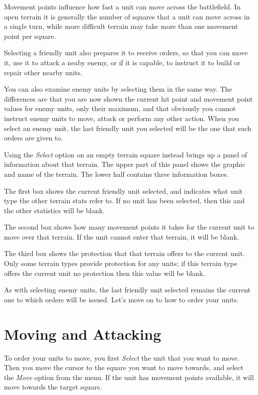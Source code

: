 Movement points influence how fast a unit can move across the battlefield. In open terrain it is generally the number of squares that a unit can move across in a single turn, while more difficult terrain may take more than one movement point per square.

Selecting a friendly unit also prepares it to receive orders, so that you can move it, use it to attack a neaby enemy, or if it is capable, to instruct it to build or repair other nearby units.

You can also examine enemy units by selecting them in the same way. The differences are that you are now shown the current hit point and movement point values for enemy units, only their maximum, and that obviously you cannot instruct enemy units to move, attack or perform any other action. When you select an enemy unit, the last friendly unit you selected will be the one that such orders are given to.

Using the {\it Select} option on an empty terrain square instead brings up a panel of information about that terrain. The upper part of this panel shows the graphic and name of the terrain. The lower half contains three information boxes.

The first box shows the current friendly unit selected, and indicates what unit type the other terrain stats refer to. If no unit has been selected, then this and the other statistics will be blank.

The second box shows how many movement points it takes for the current unit to move over that terrain. If the unit cannot enter that terrain, it will be blank.

The third box shows the protection that that terrain offers to the current unit. Only some terrain types provide protection for any units; if this terrain type offers the current unit no protection then this value will be blank.

As with selecting enemy units, the last friendly unit selected remains the current one to which orders will be issued. Let's move on to how to order your units.

\section{Moving and Attacking}

\noindent
To order your units to move, you first {\it Select} the unit that you want to move. Then you move the cursor to the square you want to move towards, and select the {\it Move} option from the menu. If the unit has movement points available, it will move towards the target square.

